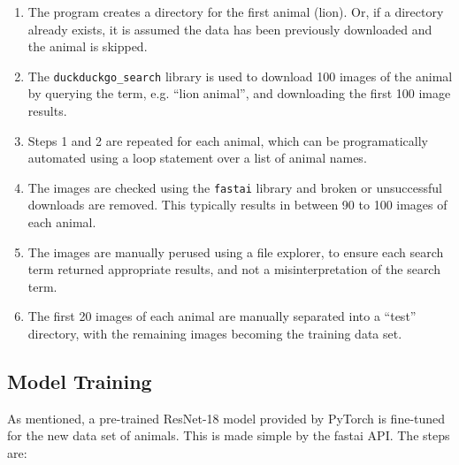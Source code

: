 \begin{enumerate}
  \item The program creates a directory for the first animal (lion). Or, if a directory already exists, it is assumed the data has been previously downloaded and the animal is skipped.

  \item The \texttt{duckduckgo\_search} library \cite{deedy5_2023} is used to download 100 images of the animal by querying the term, e.g. ``lion animal'', and downloading the first 100 image results.

  \item Steps 1 and 2 are repeated for each animal, which can be programatically automated using a loop statement over a list of animal names.

  \item The images are checked using the \texttt{fastai} library and broken or unsuccessful downloads are removed. This typically results in between 90 to 100 images of each animal.

  \item The images are manually perused using a file explorer, to ensure each search term returned appropriate results, and not a misinterpretation of the search term.

  \item The first 20 images of each animal are manually separated into a ``test'' directory, with the remaining images becoming the training data set.

\end{enumerate}

\subsection{Model Training}

As mentioned, a pre-trained ResNet-18 model provided by PyTorch is fine-tuned for the new data set of animals. This is made simple by the fastai API. The steps are:

